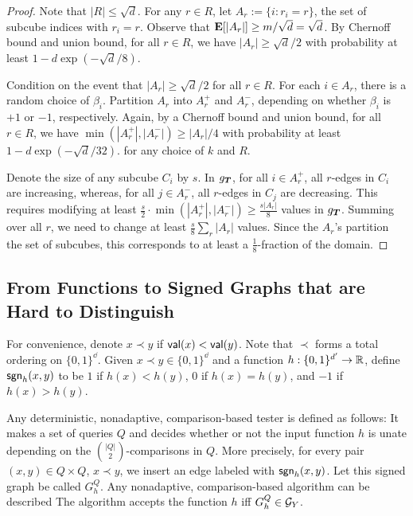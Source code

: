 \begin{proof}
	Note that $|R| \leq \sqrt{d}$.
	For any $r \in R$, let $A_r := \{ i : r_i = r \}$, the set of subcube indices with $r_i = r$.	
	Observe that $\hbox{\bf E}[|A_r|] \geq m/\sqrt{d} = \sqrt{d}$. By Chernoff bound and union bound, for all $r \in R$,
	we have $|A_r| \geq \sqrt{d}/2$	with probability at least $1 - d\exp(-\sqrt{d}/8)$.
	
	Condition on the event that $|A_r| \geq \sqrt{d}/2$ for all $r \in R$.
	For each $i \in A_r$, there is a random choice of $\beta_i$.
	Partition $A_r$ into $A^+_r$ and $A^-_r$,
	depending on whether $\beta_i$ is $+1$ or $-1$, respectively. Again, by a Chernoff bound
	and union bound, for all $r \in R$, we have $\min(|A^+_r|,|A^-_r|) \geq |A_r|/4$ with probability at least $1-d\exp(-\sqrt{d}/32)$.
	for any choice of $k$ and $R$. 
	
	Denote the size of any subcube $C_i$ by $s$.
	In $g_{\boldsymbol{T}}$, for all $i \in A^+_r$, all $r$-edges in $C_i$ are increasing, whereas, for all $j \in A^-_r$, all $r$-edges in $C_j$ are decreasing. 
	This requires modifying at least $\frac{s}{2} \cdot \min(|A^+_r|,|A^-_r|) \geq \frac{s|A_r|}{8}$ values in $g_{\boldsymbol{T}}$. Summing over all $r$, we need to change at least $\frac{s}{8}\sum_r |A_r|$
	values. Since the $A_r$'s partition the set of subcubes, this corresponds to at least a $\frac{1}{8}$-fraction of the domain.
\end{proof}


\subsection{From Functions to Signed Graphs that are Hard to Distinguish} \label{sec:f-graph}
For convenience, denote $x \prec y$ if $\mathsf{val}(x) < \mathsf{val}(y)$. Note that $\prec$ forms a total ordering
on $\{0,1\}^{\dd}$.
Given $x \prec y\in \{0,1\}^\dd$ and a function $h:\{0,1\}^{d'}\to {\mathbb R}$, define
$\mathsf{sgn}_h(x,y)$ to be $1$ if $h(x) < h(y)$, $0$ if $h(x) = h(y)$,
and $-1$ if $h(x) > h(y)$.

Any deterministic, nonadaptive, comparison-based tester is defined as follows:
It makes a set of queries $Q$ and decides whether or not the input function $h$ is unate
depending on the $|Q|\choose{2}$-comparisons in $Q$.
More precisely, for every pair $(x,y) \in Q \times Q$,
$x \prec y$, we insert
an edge labeled with $\mathsf{sgn}_h(x,y)$. Let this signed graph be called $G^Q_h$.
Any nonadaptive, comparison-based algorithm can be described
The algorithm accepts the function $h$ iff $G^Q_h \in \mathcal{G}_Y$.

